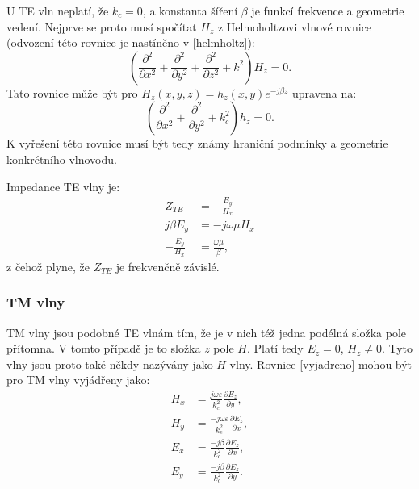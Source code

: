 \documentclass[12pt,a4paper,oneside]{article}
\numberwithin{equation}{section} %
\numberwithin{figure}{section} %
\numberwithin{table}{section} %
\begin{document}
U TE vln neplatí, že $k_c = 0$, a konstanta šíření $\beta$ je funkcí frekvence a geometrie vedení. Nejprve se proto musí spočítat $H_z$ z Helmoholtzovi vlnové rovnice (odvození této rovnice je nastíněno v \ref{helmholtz}):
\begin{equation}
\left( \frac{\partial ^2}{\partial x^2} + \frac{\partial ^2}{\partial y^2} + \frac{\partial ^2}{\partial z^2} + k^2 \right) H_z = 0 .
\end{equation}
Tato rovnice může být pro $H_z(x,y,z) = h_z(x,y)e^{-j \beta z}$ upravena na:
\begin{equation}
\left( \frac{\partial ^2}{\partial x^2} + \frac{\partial ^2}{\partial y^2} + k^2_c \right) h_z = 0 .
\end{equation}
K vyřešení této rovnice musí být tedy známy hraniční podmínky a geometrie konkrétního vlnovodu.

Impedance TE vlny je:
\begin{subequations}
\begin{align}
Z_{TE} &= - \frac{E_y}{H_x}
\\
j \beta E_y &= - j \omega \mu H_x
\\
- \frac{E_y}{H_x} &= \frac{\omega \mu}{\beta} ,
\end{align}
\end{subequations}
z čehož plyne, že $Z_{TE}$ je frekvenčně závislé.

\subsubsection{TM vlny}
TM vlny jsou podobné TE vlnám tím, že je v nich též jedna podélná složka pole přítomna. V tomto případě je to složka $z$ pole $H$. Platí tedy $E_z = 0$, $H_z \neq 0$. Tyto vlny jsou proto také někdy nazývány jako $H$ vlny. Rovnice \ref{vyjadreno} mohou být pro TM vlny vyjádřeny jako:
\begin{subequations}
\begin{align}
H_x &= \frac{j \omega \varepsilon}{k^2_c} \frac{\partial E_z}{\partial y} ,
\\
H_y &= \frac{-j \omega \varepsilon}{k^2_c} \frac{\partial E_z}{\partial x} ,
\\
E_x &= \frac{-j \beta}{k^2_c} \frac{\partial E_z}{\partial x} ,
\\
E_y &= \frac{-j \beta}{k^2_c} \frac{\partial E_z}{\partial y} .
\end{align}
\end{subequations}
\end{document}
